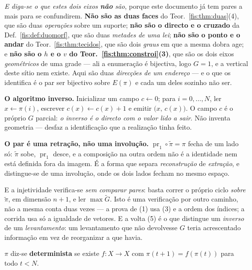 \documentclass[livro.tex]{subfiles}
\begin{document}
\medskip\noindent\emph{E diga-se o que estes dois eixos \textbf{não} são}, porque
este documento já tem pares a mais para se confundirem. \textbf{Não são as duas
faces} do Teor.~\ref{fis:thm:duas}(4), que são duas \emph{operações} sobre um
suporte; \textbf{não são o directo e o cruzado} da Def.~\ref{fis:def:duomorf},
que são duas \emph{metades de uma lei}; \textbf{não são o ponto e o andar} do
Teor.~\ref{fis:thm:tecidos}, que são dois \emph{graus} em que a mesma dobra age;
e \textbf{não são o $h$ e o $v$ do Teor.~\ref{fis:thm:constroi}(3)}, que são os
dois eixos \emph{geométricos} de uma grade --- ali a enumeração é bijectiva, logo
$G=1$, e a vertical deste sítio nem existe. Aqui são duas \emph{direcções de
um endereço} --- e o que os identifica é o par ser bijectivo sobre $E(\pi)$ e cada
um deles sozinho não ser.

\medskip\noindent\textbf{O algoritmo inverso.} Inicializar um campo $c\leftarrow0$;
para $i=0,\dots,N$, ler $x\leftarrow\pi(i)$, escrever $c(x)\leftarrow c(x)+1$ e
emitir $\bigl(x,\,c(x)\bigr)$. O campo $c$ é o próprio $G$ parcial: \emph{o
inverso é o directo com o valor lido a sair}. Não inventa geometria --- desfaz a
identificação que a realização tinha feito.

\medskip\noindent\textbf{O par é uma retração, não uma involução.}
$\operatorname{pr}_1\circ\tilde\pi=\pi$ fecha de um lado só: $\tilde\pi$ sobe,
$\operatorname{pr}_1$ desce, e a composição na outra ordem não é a identidade nem
está definida fora da imagem. É a forma que separa \emph{reconstrução} de
\emph{extração}, e distingue-se de uma involução, onde os dois lados fecham no
mesmo espaço.

\medskip\noindent E a injetividade verifica-se \emph{sem comparar pares}: basta
correr o próprio ciclo \emph{sobre $\tilde\pi$}, em dimensão $n+1$, e ler
$\max\tilde G$. Isto é uma verificação por outro caminho, não a mesma conta duas
vezes --- a prova de (1) usa (3) e a ordem dos índices; a corrida usa só a
igualdade de vetores. E a volta (5) é o que distingue um \emph{inverso} de um
\emph{levantamento}: um levantamento que não devolvesse $G$ teria acrescentado
informação em vez de reorganizar a que havia.



\begin{definicao}\label{fis:def:determinista}
$\pi$ diz-se \textbf{determinista} se existe $f\colon X\to X$ com
$\pi(t+1)=f(\pi(t))$ para todo $t<N$.
\end{definicao}
\end{document}
